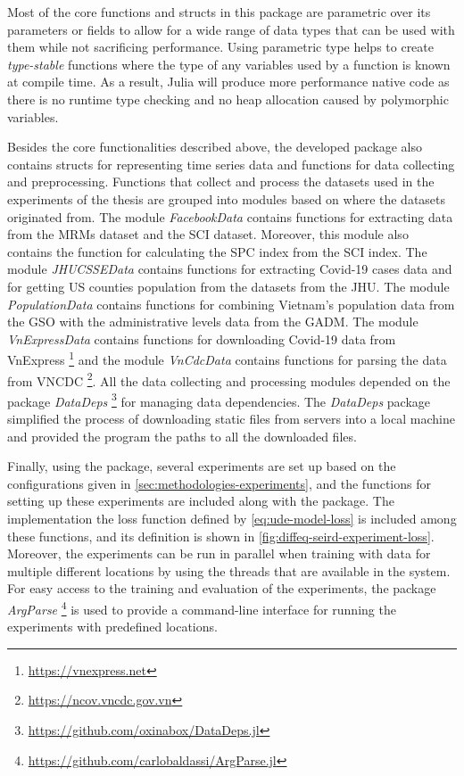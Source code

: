 Most of the core functions and structs in this package are parametric over its parameters or fields to allow for a wide range of data types that can be used with them while not sacrificing performance.
Using parametric type helps to create \textit{type-stable} functions where the type of any variables used by a function is known at compile time.
As a result, Julia will produce more performance native code as there is no runtime type checking and no heap allocation caused by polymorphic variables.

Besides the core functionalities described above, the developed package also contains structs for representing time series data and functions for data collecting and preprocessing.
Functions that collect and process the datasets used in the experiments of the thesis are grouped into modules based on where the datasets originated from.
The module \textit{FacebookData} contains functions for extracting data from the \glspl{MRM} dataset and the \gls{SCI} dataset.
Moreover, this module also contains the function for calculating the \gls{SPC} index from the \gls{SCI} index.
The module \textit{JHUCSSEData} contains functions for extracting Covid-19 cases data and for getting \gls{US} counties population from the datasets from the \gls{JHU}.
The module \textit{PopulationData} contains functions for combining Vietnam's population data from the \gls{GSO} with the administrative levels data from the \gls{GADM}.
The module \textit{VnExpressData} contains functions for downloading Covid-19 data from VnExpress \footnote{\url{https://vnexpress.net}} and the module \textit{VnCdcData} contains functions for parsing the data from \gls{VNCDC} \footnote{\url{https://ncov.vncdc.gov.vn}}.
All the data collecting and processing modules depended on the package \textit{DataDeps} \footnote{\url{https://github.com/oxinabox/DataDeps.jl}} for managing data dependencies.
The \textit{DataDeps} package simplified the process of downloading static files from servers into a local machine and provided the program the paths to all the downloaded files.

Finally, using the package, several experiments are set up based on the configurations given in \autoref{sec:methodologies-experiments}, and the functions for setting up these experiments are included along with the package.
The implementation the loss function defined by \autoref{eq:ude-model-loss} is included among these functions, and its definition is shown in \autoref{fig:diffeq-seird-experiment-loss}.
Moreover, the experiments can be run in parallel when training with data for multiple different locations by using the threads that are available in the system.
For easy access to the training and evaluation of the experiments, the package \textit{ArgParse} \footnote{\url{https://github.com/carlobaldassi/ArgParse.jl}} is used to provide a command-line interface for running the experiments with predefined locations.
